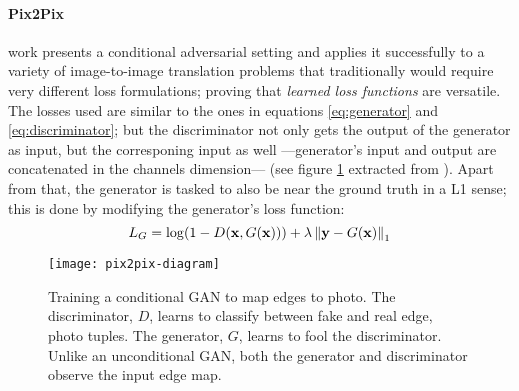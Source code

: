 \documentclass[../main.tex]{subfiles}
\begin{document}
\paragraph{Pix2Pix}
\parencite{Isola2016} work presents a conditional adversarial setting and applies
it successfully to a variety of image-to-image translation problems that
traditionally would require very different loss formulations; proving that
\emph{learned loss functions} are versatile.
The losses used are similar to the ones in equations \eqref{eq:generator} and
\eqref{eq:discriminator}; but the discriminator not only gets the output of
the generator as input, but the corresponing input as well ---generator's input
and output are concatenated in the channels dimension---
(see figure \ref{fig:pix2pix} extracted from \cite{Isola2016}).
Apart from that, the generator is tasked to also be
near the ground truth in a L1 sense; this is done by modifying the generator's
loss function:
\begin{equation}
L_G = \log(1 - D(\mathbf{x}, G(\mathbf{x}))) +
\lambda \left\| \mathbf{y} - G(\mathbf{x}) \right\|_1
\end{equation}

\begin{figure}[H]
\centering
\texttt{[image: pix2pix-diagram]}
\caption{Training a conditional GAN to map edges to photo.
The discriminator, $D$, learns to classify between fake and real {edge, photo}
tuples. The generator, $G$, learns to fool the discriminator.
Unlike an unconditional GAN, both the generator and discriminator observe the
input edge map.}
\label{fig:pix2pix}
\end{figure}
\end{document}
